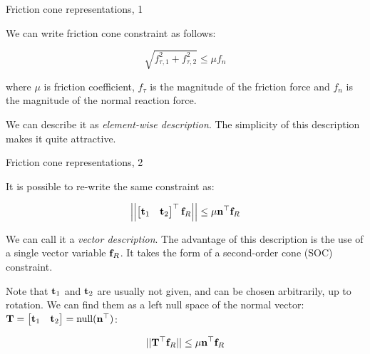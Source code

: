\documentclass{beamer}
\begin{document}
\begin{frame}{Friction cone representations, 1}
	\begin{flushleft}
		
		We can write friction cone constraint as follows:
		
		\begin{equation}
			\sqrt{f_{\tau, 1}^2 + f_{\tau, 2}^2} \leq \mu f_n
		\end{equation}
		
		where $\mu$ is friction coefficient, $f_\tau$ is the magnitude of the friction force and $f_n$ is the magnitude of the normal reaction force.
		
		\bigskip
		
		We can describe it as \emph{element-wise description}. The simplicity of this description makes it quite attractive.
		
		
	\end{flushleft}
\end{frame}


\begin{frame}{Friction cone representations, 2}
	\begin{flushleft}
		
		It is possible to re-write the same constraint as:
		
		\begin{equation}
			\left|\left| \begin{bmatrix}
				\mathbf{t}_1 & \mathbf{t}_2
			\end{bmatrix}^\top
			\mathbf{f}_R \right|\right| 
			\leq \mu \mathbf{n}^\top \mathbf{f}_R
		\end{equation}
		
		We can call it a \emph{vector description}. The advantage of this description is the use of a single vector variable $\mathbf{f}_R$. It takes the form of a second-order cone (SOC) constraint.
		
		\bigskip
		
		Note that $\mathbf{t}_1$ and $\mathbf{t}_2$ are usually not given, and can be chosen arbitrarily, up to rotation. We can find them as a left null space of the normal vector: $\mathbf{T} = \begin{bmatrix}
			\mathbf{t}_1 & \mathbf{t}_2
		\end{bmatrix} = \text{null}(\mathbf{n}^\top)$: 
		
		\begin{equation}
			|| \mathbf{T}^\top\mathbf{f}_R ||
			\leq \mu \mathbf{n}^\top \mathbf{f}_R
		\end{equation}
		
	\end{flushleft}
\end{frame}
\end{document}
